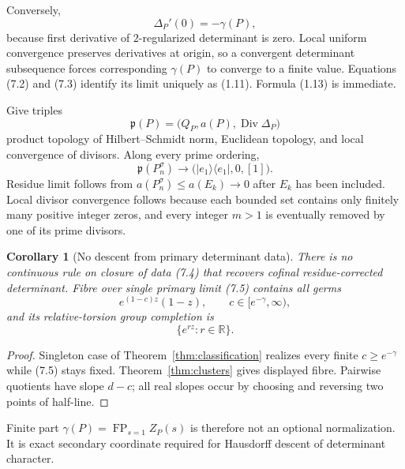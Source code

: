 \documentclass[11pt]{article}
\newtheorem{corollary}[theorem]{Corollary}
\theoremstyle{definition}
\theoremstyle{remark}
\newcommand{\R}{\mathbb R}
\newcommand{\FP}{\operatorname*{FP}}
\newcommand{\Div}{\operatorname{Div}}
\begin{document}
Conversely,
\begin{equation}
 \Delta_P'(0)=-\gamma(P),                                 \tag{7.3}
\end{equation}
because first derivative of $2$-regularized determinant is zero.  Local uniform convergence
preserves derivatives at origin, so a convergent determinant subsequence forces corresponding
$\gamma(P)$ to converge to a finite value.  Equations (7.2) and (7.3) identify its limit uniquely
as (1.11).  Formula (1.13) is immediate.

Give triples
\begin{equation}
 \mathfrak p(P)=\bigl(Q_P,a(P),\Div\Delta_P\bigr)           \tag{7.4}
\end{equation}
product topology of Hilbert--Schmidt norm, Euclidean topology, and local convergence of divisors.
Along every prime ordering,
\begin{equation}
 \mathfrak p(P_n^\sigma)\longrightarrow
 \bigl(|e_1\rangle\langle e_1|,0,[1]\bigr).               \tag{7.5}
\end{equation}
Residue limit follows from $a(P_n^\sigma)\leq a(E_k)\to0$ after $E_k$ has been included.
Local divisor convergence follows because each bounded set contains only finitely many positive
integer zeros, and every integer $m>1$ is eventually removed by one of its prime divisors.

\begin{corollary}[No descent from primary determinant data]
\label{cor:nodescent}
There is no continuous rule on closure of data \emph{(7.4)} that recovers cofinal
residue-corrected determinant.  Fibre over single primary limit \emph{(7.5)} contains all germs
\[
 e^{(1-c)z}(1-z),\qquad c\in[e^{-\gamma},\infty),
\]
and its relative-torsion group completion is
\begin{equation}
 \{e^{rz}:r\in\R\}.                                      \tag{7.6}
\end{equation}
\end{corollary}

\begin{proof}
Singleton case of Theorem~\ref{thm:classification} realizes every finite
$c\geq e^{-\gamma}$ while (7.5) stays fixed.  Theorem~\ref{thm:clusters} gives displayed fibre.
Pairwise quotients have slope $d-c$; all real slopes occur by choosing and reversing two points
of half-line.
\end{proof}

Finite part $\gamma(P)=\FP_{s=1}Z_P(s)$ is therefore not an optional normalization.  It is exact
secondary coordinate required for Hausdorff descent of determinant character.
\end{document}
